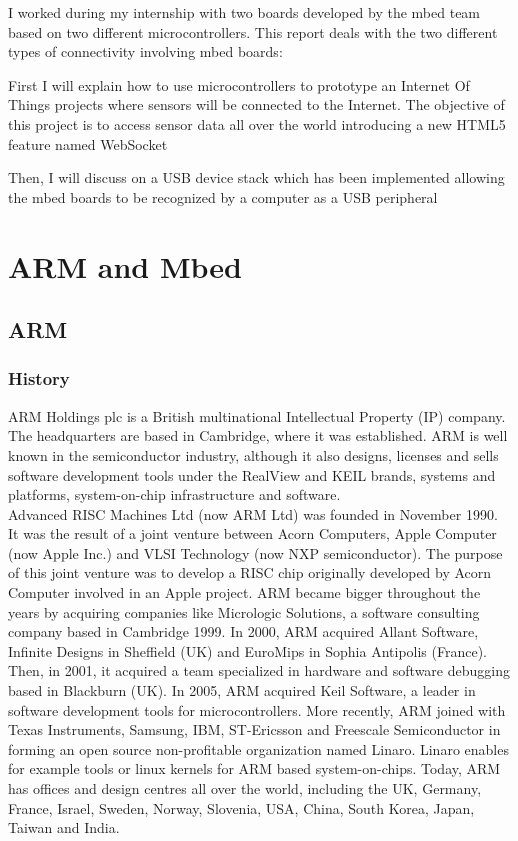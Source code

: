 \documentclass[pdftex,10pt,a4paper]{report}
\newenvironment{packed_item}{
\begin{itemize}
  \setlength{\itemsep}{1pt}
  \setlength{\parskip}{0pt}
  \setlength{\parsep}{0pt}
}{\end{itemize}}
\begin{document}
I worked during my internship with two boards developed by the mbed team based on two different microcontrollers. This report deals with the two different types of connectivity involving mbed boards:
\begin{packed_item}
	\item First I will explain how to use microcontrollers to prototype an Internet Of Things projects where sensors will be connected to the Internet. The objective of this project is to access sensor data all over the world introducing a new HTML5 feature named WebSocket
	\item Then, I will discuss on a USB device stack which has been implemented allowing the mbed boards to be recognized by a computer as a USB peripheral
\end{packed_item}

\tableofcontents

\chapter{ARM and Mbed}
\section{ARM}
\subsection{History}
ARM Holdings plc is a British multinational Intellectual Property (IP) company. The headquarters are based in Cambridge, where it was established. ARM is well known in the semiconductor industry, although it also designs, licenses and sells software development tools under the RealView and KEIL brands, systems and platforms, system-on-chip infrastructure and software. 
\\

Advanced RISC Machines Ltd (now ARM Ltd) was founded in November 1990. It was the result of a joint venture between Acorn Computers, Apple Computer (now Apple Inc.) and VLSI Technology (now NXP semiconductor). The purpose of this joint venture was to develop a RISC chip originally developed by Acorn Computer involved in an Apple project. ARM became bigger throughout the years by acquiring companies like Micrologic Solutions, a software consulting company based in Cambridge 1999. In 2000, ARM acquired Allant Software, Infinite Designs in Sheffield (UK) and EuroMips in Sophia Antipolis (France). Then, in 2001, it acquired a team specialized in hardware and software debugging based in Blackburn (UK). In 2005, ARM acquired Keil Software, a leader in software development tools for microcontrollers. More recently, ARM joined with Texas Instruments, Samsung, IBM, ST-Ericsson and Freescale Semiconductor in forming an open source non-profitable organization named Linaro. Linaro enables for example tools or linux kernels for ARM based system-on-chips. Today, ARM has offices and design centres all over the world, including the UK, Germany, France, Israel, Sweden, Norway, Slovenia, USA, China, South Korea, Japan, Taiwan and India. 
\\
\end{document}
